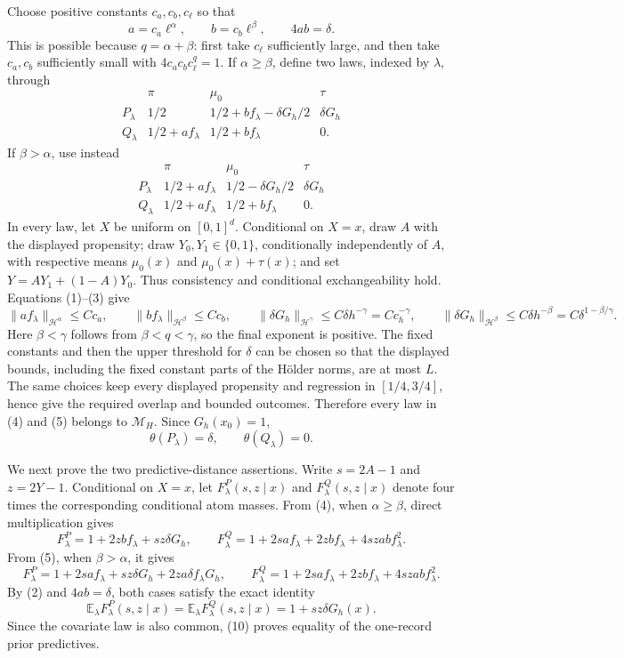 Choose positive constants \(c_a,c_b,c_\ell\) so that
\[
 a=c_a\ell^\alpha,\qquad b=c_b\ell^\beta,\qquad 4ab=\delta.
 \tag{3}
\]
This is possible because \(q=\alpha+\beta\): first take \(c_\ell\) sufficiently large, and then take \(c_a,c_b\) sufficiently small with \(4c_ac_bc_\ell^q=1\).  If \(\alpha\ge\beta\), define two laws, indexed by \(\lambda\), through
\[
\begin{array}{c|ccc}
 &\pi&\mu_0&\tau\\ \hline
 P_\lambda&1/2&1/2+b f_\lambda-\delta G_h/2&\delta G_h\\
 Q_\lambda&1/2+a f_\lambda&1/2+b f_\lambda&0.
\end{array}
\tag{4}
\]
If \(\beta>\alpha\), use instead
\[
\begin{array}{c|ccc}
 &\pi&\mu_0&\tau\\ \hline
 P_\lambda&1/2+a f_\lambda&1/2-\delta G_h/2&\delta G_h\\
 Q_\lambda&1/2+a f_\lambda&1/2+b f_\lambda&0.
\end{array}
\tag{5}
\]
In every law, let \(X\) be uniform on \([0,1]^d\).  Conditional on \(X=x\), draw \(A\) with the displayed propensity; draw \(Y_0,Y_1\in\{0,1\}\), conditionally independently of \(A\), with respective means \(\mu_0(x)\) and \(\mu_0(x)+\tau(x)\); and set \(Y=AY_1+(1-A)Y_0\).  Thus consistency and conditional exchangeability hold.  Equations (1)--(3) give
\[
 \|a f_\lambda\|_{\mathcal H^\alpha}\le Cc_a,\qquad
 \|b f_\lambda\|_{\mathcal H^\beta}\le Cc_b,\qquad
 \|\delta G_h\|_{\mathcal H^\gamma}\le C\delta h^{-\gamma}=Cc_h^{-\gamma},
 \qquad
 \|\delta G_h\|_{\mathcal H^\beta}\le C\delta h^{-\beta}
 =C\delta^{1-\beta/\gamma}.
 \tag{6}
\]
Here \(\beta<\gamma\) follows from \(\beta<q<\gamma\), so the final exponent is positive.  The fixed constants and then the upper threshold for \(\delta\) can be chosen so that the displayed bounds, including the fixed constant parts of the Hölder norms, are at most \(L\).  The same choices keep every displayed propensity and regression in \([1/4,3/4]\), hence give the required overlap and bounded outcomes.  Therefore every law in (4) and (5) belongs to \(\mathcal M_H\).  Since \(G_h(x_0)=1\),
\[
 \theta(P_\lambda)=\delta,\qquad \theta(Q_\lambda)=0.
 \tag{7}
\]

We next prove the two predictive-distance assertions.  Write \(s=2A-1\) and \(z=2Y-1\).  Conditional on \(X=x\), let \(F^P_\lambda(s,z\mid x)\) and \(F^Q_\lambda(s,z\mid x)\) denote four times the corresponding conditional atom masses.  From (4), when \(\alpha\ge\beta\), direct multiplication gives
\[
 F^P_\lambda=1+2zb f_\lambda+sz\delta G_h,
 \qquad
 F^Q_\lambda=1+2sa f_\lambda+2zb f_\lambda+4szab f_\lambda^2.
 \tag{8}
\]
From (5), when \(\beta>\alpha\), it gives
\[
 F^P_\lambda=1+2sa f_\lambda+sz\delta G_h+2za\delta f_\lambda G_h,
 \qquad
 F^Q_\lambda=1+2sa f_\lambda+2zb f_\lambda+4szab f_\lambda^2.
 \tag{9}
\]
By (2) and \(4ab=\delta\), both cases satisfy the exact identity
\[
 \mathbb E_\lambda F^P_\lambda(s,z\mid x)
 =\mathbb E_\lambda F^Q_\lambda(s,z\mid x)
 =1+sz\delta G_h(x).
 \tag{10}
\]
Since the covariate law is also common, (10) proves equality of the one-record prior predictives.

